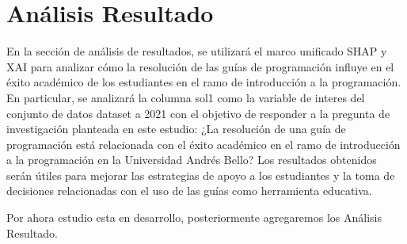 \hypertarget{analisis_resultado}{%
    \section{Análisis Resultado}\label{Análisis Resultado}}

En la sección de análisis de resultados, se utilizará el marco unificado SHAP y XAI para analizar cómo la resolución de las guías de programación influye en el éxito académico de los estudiantes en el ramo de introducción a la programación. En particular, se analizará la columna sol1 como la variable de interes del conjunto de datos dataset a 2021 con el objetivo de responder a la pregunta de investigación planteada en este estudio: ¿La resolución de una guía de programación está relacionada con el éxito académico en el ramo de introducción a la programación en la Universidad Andrés Bello? Los resultados obtenidos serán útiles para mejorar las estrategias de apoyo a los estudiantes y la toma de decisiones relacionadas con el uso de las guías como herramienta educativa.


Por ahora estudio esta en desarrollo, posteriormente agregaremos los Análisis Resultado.
